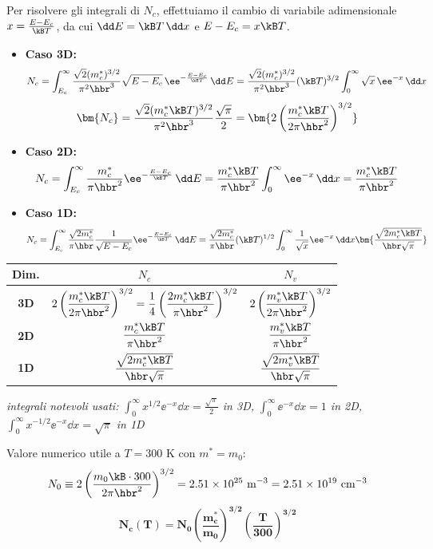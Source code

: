 Per risolvere gli integrali di $N_c$, effettuiamo il cambio di variabile adimensionale $x = \frac{E-E_c}{\kB T}$, da cui $\dd E = \kB T\,\dd x$ e $E-E_c = x\kB T$.
\begin{itemize}
    \item \textbf{Caso 3D:}
\[ N_c = \int_{E_c}^{\infty} \frac{\sqrt{2}(m_c^*)^{3/2}}{\pi^2\hbr^3}\sqrt{E-E_c} \, \ee^{-\frac{E-E_c}{\kB T}}\,\dd E = \frac{\sqrt{2}(m_c^*)^{3/2}}{\pi^2\hbr^3} (\kB T)^{3/2} \int_0^\infty \sqrt{x}\, \ee^{-x}\,\dd x \]
\[ \bm{N_c} = \frac{\sqrt{2}(m_c^*\kB T)^{3/2}}{\pi^2\hbr^3} \frac{\sqrt{\pi}}{2} = \bm{2 \left( \frac{m_c^*\kB T}{2\pi\hbr^2} \right)^{3/2}} \]

\item \textbf{Caso 2D:}
\[ N_c = \int_{E_c}^{\infty} \frac{m_c^*}{\pi\hbr^2} \ee^{-\frac{E-E_c}{\kB T}}\,\dd E = \frac{m_c^*\kB T}{\pi\hbr^2} \int_0^\infty \ee^{-x}\,\dd x  = \frac{m_c^*\kB T}{\pi\hbr^2} \]

\item \textbf{Caso 1D:}
\[ N_c = \int_{E_c}^{\infty} \frac{\sqrt{2m_c^*}}{\pi\hbr}\frac{1}{\sqrt{E-E_c}} \ee^{-\frac{E-E_c}{\kB T}}\,\dd E = \frac{\sqrt{2m_c^*}}{\pi\hbr} (\kB T)^{1/2} \int_0^\infty \frac{1}{\sqrt{x}} \ee^{-x}\,\dd x  \bm{\frac{\sqrt{2m_c^*\kB T}}{\hbr\sqrt{\pi}}} \]
\end{itemize}


\begin{center}
\renewcommand{\arraystretch}{2.0}
\begin{tabular}{c c c}
\toprule
Dim. & $N_c$ & $N_v$ \\
\midrule
\textbf{3D} & $2\left(\dfrac{m_c^*\kB T}{2\pi\hbr^2}\right)^{3/2} = \dfrac14\left(\dfrac{2m_c^*\kB T}{\pi\hbr^2}\right)^{3/2}$
            & $2\left(\dfrac{m_v^*\kB T}{2\pi\hbr^2}\right)^{3/2}$ \\
\textbf{2D} & $\dfrac{m_c^*\kB T}{\pi\hbr^2}$ & $\dfrac{m_v^*\kB T}{\pi\hbr^2}$ \\
\textbf{1D} & $\dfrac{\sqrt{2m_c^*\kB T}}{\hbr\sqrt{\pi}}$ & $\dfrac{\sqrt{2m_v^*\kB T}}{\hbr\sqrt{\pi}}$ \\
\bottomrule
\end{tabular}
\end{center}
\textit{integrali notevoli usati: $\int_0^\infty x^{1/2}\ee^{-x}\dd x=\frac{\sqrt\pi}{2}$ in 3D, $\int_0^\infty \ee^{-x}\dd x = 1$ in 2D, $\int_0^\infty x^{-1/2}\ee^{-x}\dd x=\sqrt\pi$ in 1D}



\vspace{0.15cm}
\noindent Valore numerico utile a $T=300$ K con $m^*=m_0$:
\[ N_0 \equiv 2\left(\frac{m_0\kB\cdot300}{2\pi\hbr^2}\right)^{3/2} = 2.51\times10^{25}\ \text{m}^{-3} = 2.51\times10^{19}\ \text{cm}^{-3} \]
\[ \bm{N_c(T) = N_0\left(\frac{m_c^*}{m_0}\right)^{3/2}\left(\frac{T}{300}\right)^{3/2}} \]


